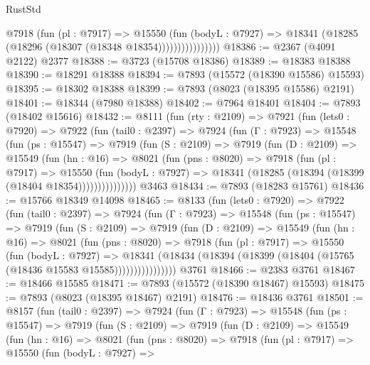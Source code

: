 \begin{lexlean}{RustStd}
\begin{coremodule}
                      @7918
                        (fun (pl : @7917) =>
                        @15550
                          (fun (bodyL : @7927) =>
                          @18341 (@18285 (@18296 (@18307 (@18348 @18354))))))))))))))))
@18386 := @2367 (@4091 @2122) @2377
@18388 := @3723 (@15708 @18386)
@18389 := @18383 @18388
@18390 := @18291 @18388
@18394 := @7893 (@15572 (@18390 @15586) @15593)
@18395 := @18302 @18388
@18399 := @7893 (@8023 (@18395 @15586) @2191)
@18401 := @18344 (@7980 @18388)
@18402 := @7964 @18401
@18404 := @7893 (@18402 @15616)
@18432 := @8111
    (fun (rty : @2109) =>
    @7921
      (fun (lets0 : @7920) =>
      @7922
        (fun (tail0 : @2397) =>
        @7924
          (fun (Γ : @7923) =>
          @15548
            (fun (ps : @15547) =>
            @7919
              (fun (S : @2109) =>
              @7919
                (fun (D : @2109) =>
                @15549
                  (fun (hn : @16) =>
                  @8021
                    (fun (pns : @8020) =>
                    @7918
                      (fun (pl : @7917) =>
                      @15550
                        (fun (bodyL : @7927) =>
                        @18341 (@18285 (@18394 (@18399 (@18404 @18354)))))))))))))))
    @3463
@18434 := @7893 (@18283 @15761)
@18436 := @15766 @18349 @14098
@18465 := @8133
    (fun (lets0 : @7920) =>
    @7922
      (fun (tail0 : @2397) =>
      @7924
        (fun (Γ : @7923) =>
        @15548
          (fun (ps : @15547) =>
          @7919
            (fun (S : @2109) =>
            @7919
              (fun (D : @2109) =>
              @15549
                (fun (hn : @16) =>
                @8021
                  (fun (pns : @8020) =>
                  @7918
                    (fun (pl : @7917) =>
                    @15550
                      (fun (bodyL : @7927) =>
                      @18341
                        (@18434
                          (@18394 (@18399 (@18404 (@15765 (@18436 @15583 @15585))))))))))))))))
    @3761
@18466 := @2383 @3761
@18467 := @18466 @15585
@18471 := @7893 (@15572 (@18390 @18467) @15593)
@18475 := @7893 (@8023 (@18395 @18467) @2191)
@18476 := @18436 @3761
@18501 := @8157
    (fun (tail0 : @2397) =>
    @7924
      (fun (Γ : @7923) =>
      @15548
        (fun (ps : @15547) =>
        @7919
          (fun (S : @2109) =>
          @7919
            (fun (D : @2109) =>
            @15549
              (fun (hn : @16) =>
              @8021
                (fun (pns : @8020) =>
                @7918
                  (fun (pl : @7917) =>
                  @15550
                    (fun (bodyL : @7927) =>

\end{coremodule}
\end{lexlean}
